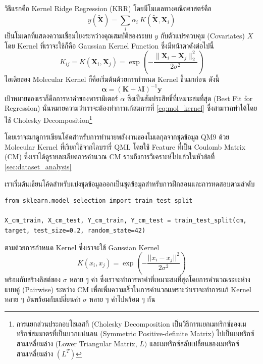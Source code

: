 วิธีแรกคือ Kernel Ridge Regression (KRR) โดยมีโมเดลทางคณิตศาสตร์คือ 
%
\begin{equation}
    y\left(\widetilde{\bm{X}} \right) 
    = 
    \sum_i \alpha_i \  K\left( \widetilde{\mathbf{X}}, \bm{X}_i\right)
\end{equation}
%
เป็นโมเดลที่แสดงความเชื่อมโยงระหว่างคุณสมบัติของระบบ $y$ กับตัวแปรควบคุม (Covariates) $X$ โดย Kernel ที่เราจะใช้ก็คือ Gaussian Kernel Function ซึ่งมีหน้าตาดังต่อไปนี้
%
\begin{equation}
    K_{ij} 
    = 
    K\left( \mathbf{X}_i, \bm{X}_j\right) 
    = 
    \exp\left( -\frac{\| \bm{X}_i - \bm{X}_j\|_2^2}{2\sigma^2}\right)
\end{equation}
%
ไอเดียของ Molecular Kernel ก็คือเริ่มต้นด้วยการกำหนด Kernel ขึ้นมาก่อน ดังนี้
%
\begin{equation}\label{eq:mol_kernel}
    \bm{\alpha} 
    = 
    (\bm{K} + \lambda \bm{I})^{-1} \bm{y}
\end{equation}
%
เป้าหมายของเราก็คือการหาค่าของพารามิเตอร์ $\alpha$ ซึ่งเป็นสัมประสิทธิ์ที่เหมาะสมที่สุด (Best Fit for Regression) นั่นหมายความว่าเราจะต้องทำการแก้สมการที่ \eqref{eq:mol_kernel} ซึ่งสามารถทำได้โดยใช้ Cholesky Decomposition\footnote{การแยกส่วนประกอบโชเลสกี (Cholesky Decomposition เป็นวิธีการแยกเมทริกซ์ของเมทริกซ์สมมาตรที่เป็นบวกแน่นอน (Symmetric Positive-definite Matrix) ไปเป็นเมทริกซ์สามเหลี่ยมล่าง (Lower Triangular Matrix, $L)$ และเมทริกซ์สลับเปลี่ยนของเมทริกซ์สามเหลี่ยมล่าง $(L^{T})$}

โดยเราจะมาดูการเขียนโค้ดสำหรับการทำนายพลังงานของโมเลกุลจากชุดข้อมูล QM9 ด้วย Molecular Kernel ที่เรียกใช้จากไลบรารี่ QML โดยใช้ Feature ที่เป็น Coulomb Matrix (CM) ซึ่งเราได้ดูรายละเอียดการคำนวณ CM รวมถึงการวิเคราะห์ไปแล้วในหัวข้อที่ \ref{sec:dataset_analysis}

เราเริ่มต้นเขียนโค้ดสำหรับแบ่งชุดข้อมูลออกเป็นชุดข้อมูลสำหรับการฝึกสอนและการทดสอบตามลำดับ
%
\begin{lstlisting}[style=MyPython]
from sklearn.model_selection import train_test_split

X_cm_train, X_cm_test, Y_cm_train, Y_cm_test = train_test_split(cm, target, test_size=0.2, random_state=42)
\end{lstlisting}

\noindent ตามด้วยการกำหนด Kernel ซึ่งเราจะใช้ Gaussian Kernel
%
\begin{equation}\label{eq:gaussian_kernel}
    K(x_{i}, x_{j}) 
    = 
    \exp \left( -\frac{||x_{i}-x_{j}||^2}{2\sigma^2} \right)
\end{equation}
%
พร้อมกับสร้างลิสต์ของ $\sigma$ หลาย ๆ ค่า ซึ่งเราจะทำการหาค่าที่เหมาะสมที่สุดโดยการคำนวณระยะห่างแบบคู่ (Pairwise) ระหว่าง CM เพื่อเพิ่มความเร็วในการคำนวณเพราะว่าเราจะทำการแก้ Kernel หลาย ๆ อันพร้อมกับเปลี่ยนค่า $\sigma$ หลาย ๆ ค่าไปพร้อม ๆ กัน

